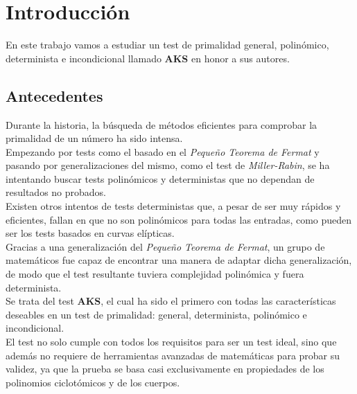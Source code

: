 %


\chapter{Introducción}

En este trabajo vamos a estudiar un test de primalidad general, polinómico, determinista e incondicional llamado \textbf{AKS} en honor a sus autores.

\section{Antecedentes}

Durante la historia, la búsqueda de métodos eficientes para comprobar la primalidad de un número ha sido intensa.\\

Empezando por tests como el basado en el \textit{Pequeño Teorema de Fermat} y pasando por generalizaciones del mismo, como el test de \textit{Miller-Rabin}, se ha intentando buscar tests polinómicos y deterministas que no dependan de resultados no probados.\\

Existen otros intentos de tests deterministas que, a pesar de ser muy rápidos y eficientes, fallan en que no son polinómicos para todas las entradas, como pueden ser los tests basados en curvas elípticas.\\

Gracias a una generalización del \textit{Pequeño Teorema de Fermat}, un grupo de matemáticos fue capaz de encontrar una manera de adaptar dicha generalización, de modo que el test resultante tuviera complejidad polinómica y fuera determinista.\\

Se trata del test \textbf{AKS}, el cual ha sido el primero con todas las características deseables en un test de primalidad: general, determinista, polinómico e incondicional.\\

El test no solo cumple con todos los requisitos para ser un test ideal, sino que además no requiere de herramientas avanzadas de matemáticas para probar su validez, ya que la prueba se basa casi exclusivamente en propiedades de los polinomios ciclotómicos y de los cuerpos.\\

